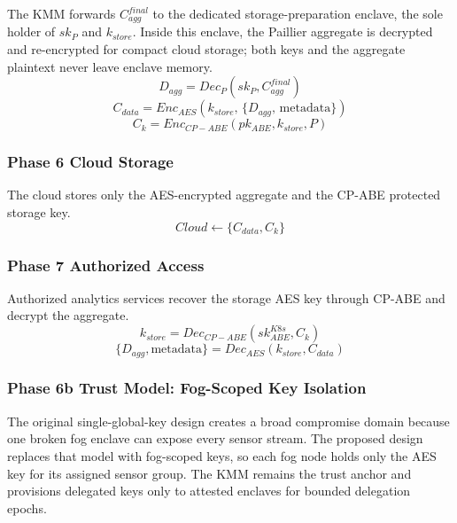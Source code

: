\documentclass[conference]{IEEEtran}
\begin{document}
    The KMM forwards $C_{agg}^{final}$ to the dedicated storage-preparation enclave, the sole holder of $sk_P$ and $k_{store}$. Inside this enclave, the Paillier aggregate is decrypted and re-encrypted for compact cloud storage; both keys and the aggregate plaintext never leave enclave memory.
    \begin{equation}
    D_{agg} = Dec_P(sk_P, C_{agg}^{final})
    \end{equation}
    \begin{equation}
    C_{data} = Enc_{AES}(k_{store},\, \{D_{agg},\, \mathrm{metadata}\})
    \end{equation}
    \begin{equation}
    C_k = Enc_{CP-ABE}(pk_{ABE}, k_{store}, P)
    \end{equation}

    \subsubsection{\textbf{Phase 6 Cloud Storage}}

    The cloud stores only the AES-encrypted aggregate and the CP-ABE protected storage key.
    \begin{equation}
    Cloud \leftarrow \{C_{data}, C_k\}
    \end{equation}

    \subsubsection{\textbf{Phase 7 Authorized Access}}

    Authorized analytics services recover the storage AES key through CP-ABE and decrypt the aggregate.
    \begin{equation}
    k_{store} = Dec_{CP-ABE}(sk_{ABE}^{K8s}, C_k)
    \end{equation}
    \begin{equation}
    \{D_{agg}, \mathrm{metadata}\} = Dec_{AES}(k_{store}, C_{data})
    \end{equation}

    \subsubsection{\textbf{Phase 6b Trust Model: Fog-Scoped Key Isolation}}

    The original single-global-key design creates a broad compromise domain because one broken fog enclave can expose every sensor stream. The proposed design replaces that model with fog-scoped keys, so each fog node holds only the AES key for its assigned sensor group. The KMM remains the trust anchor and provisions delegated keys only to attested enclaves for bounded delegation epochs.
\end{document}
